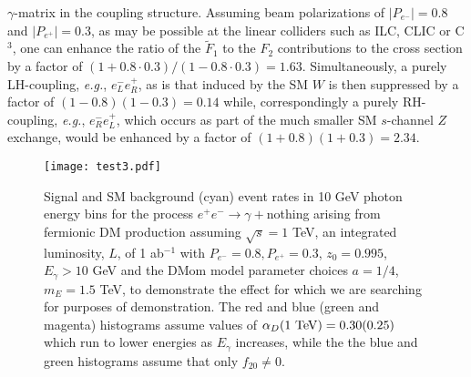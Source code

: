 \documentclass[14pt]{article}
\def\eg{{\it e.g.}}
\def\to{\rightarrow}
\begin{document}
{$\gamma$-matrix in the coupling structure. Assuming beam polarizations of $|P_{e^-}|=0.8$ and $|P_{e^+}|=0.3$, as may be possible at the linear colliders such as ILC, CLIC or 
C$^3$\cite{ILC:2007oiw,ILCInternationalDevelopmentTeam:2022izu,Aicheler:2012bya,Bai:2021rdg}, one can enhance the ratio of the $\tilde F_1$ to 
the $F_2$ contributions to the cross section by a factor of $(1+0.8\cdot 0.3)/(1-0.8\cdot 0.3)=1.63$. Simultaneously, a purely LH-coupling, \eg, $e_L^-e_R^+$, as is that induced by the 
SM $W$ is then suppressed by a factor of $(1-0.8)(1-0.3)=0.14$ while, correspondingly a purely RH-coupling, \eg, $e_R^-e_L^+$, which occurs as part of the much smaller SM $s$-channel $Z$ 
exchange, would be enhanced by a factor of $(1+0.8)(1+0.3)=2.34$. 

%
\begin{figure}[htbp]
\centerline{\texttt{[image: test3.pdf]}}
\vspace*{-1.3cm}
\caption{Signal and SM background (cyan) event rates in 10 GeV photon energy bins for the process $e^+e^-\to \gamma +$nothing arising from fermionic DM production assuming $\sqrt s=1$ TeV, an 
integrated luminosity, $L$, of 1 ab$^{-1}$ with $P_{e^-}=0.8,P_{e^+}=0.3$, $z_0=0.995$, $E_\gamma>10$ GeV and the DMom model parameter choices $a=1/4$, $m_E=1.5$ TeV, to demonstrate the 
effect for which we are searching for purposes of demonstration. The red and blue (green and magenta) histograms assume values of $\alpha_D({\rm 1~ TeV})=0.30(0.25)$ which run to lower 
energies as $E_\gamma$ increases, while the the blue and green histograms assume that only $f_{20}\neq 0$.}
\label{fig7}
\end{figure}
%

}
\end{document}
